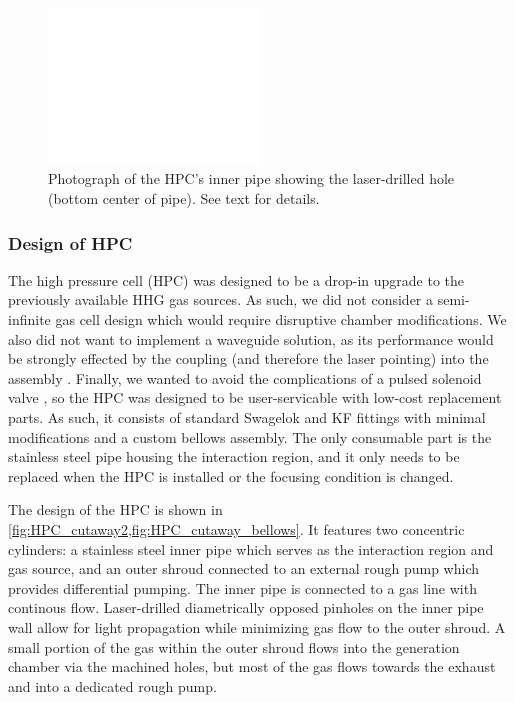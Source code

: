 \begin{figure}
	\centering
	\includegraphics[width=0.5\textwidth]{figures/chap3/HPC_laserhole_500x370.png}
	\caption{Photograph of the HPC's inner pipe showing the laser-drilled hole (bottom center of pipe). See text for details.}
	\label{fig:HPC_laserhole}
\end{figure}


\subsubsection{Design of HPC}

The high pressure cell (HPC) was designed to be a drop-in upgrade to the previously available HHG gas sources. As such, we did not consider a semi-infinite gas cell design which would require disruptive chamber modifications. We also did not want to implement a waveguide solution, as its performance would be strongly effected by the coupling (and therefore the laser pointing) into the assembly \cite{popmintchevExtendedPhaseMatching2008,popmintchevPhaseMatchingHigh2009}. Finally, we wanted to avoid the complications of a pulsed solenoid valve \cite{evenEvenLavieValveSource2015}, so the HPC was designed to be user-servicable with low-cost replacement parts. As such, it consists of standard Swagelok and KF fittings with minimal modifications and a custom bellows assembly. The only consumable part is the stainless steel pipe housing the interaction region, and it only needs to be replaced when the HPC is installed or the focusing condition is changed.

The design of the HPC is shown in \cref{fig:HPC_cutaway2,fig:HPC_cutaway_bellows}. It features two concentric cylinders: a stainless steel inner pipe which serves as the interaction region and gas source, and an outer shroud connected to an external rough pump which provides differential pumping. The inner pipe is connected to a gas line with continous flow. Laser-drilled diametrically opposed pinholes on the inner pipe wall allow for light propagation while minimizing gas flow to the outer shroud. A small portion of the gas within the outer shroud flows into the generation chamber via the machined holes, but most of the gas flows towards the exhaust and into a dedicated rough pump.

